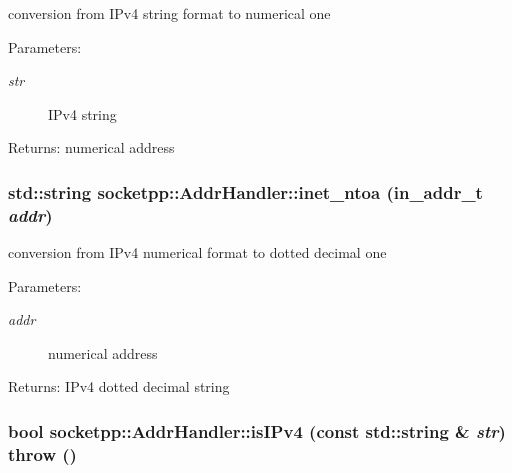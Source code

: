 conversion from IPv4 string format to numerical one 

\begin{Desc}
\item[Parameters:]
\begin{description}
\item[{\em str}]IPv4 string \end{description}
\end{Desc}
\begin{Desc}
\item[Returns:]numerical address \end{Desc}
\hypertarget{classsocketpp_1_1AddrHandler_a4377d84c8ea976aeada2b2eb0ac248d}{
\subsubsection[{inet\_\-ntoa}]{\setlength{\rightskip}{0pt plus 5cm}std::string socketpp::AddrHandler::inet\_\-ntoa (in\_\-addr\_\-t {\em addr})}}
\label{classsocketpp_1_1AddrHandler_a4377d84c8ea976aeada2b2eb0ac248d}


conversion from IPv4 numerical format to dotted decimal one 

\begin{Desc}
\item[Parameters:]
\begin{description}
\item[{\em addr}]numerical address \end{description}
\end{Desc}
\begin{Desc}
\item[Returns:]IPv4 dotted decimal string \end{Desc}
\hypertarget{classsocketpp_1_1AddrHandler_652e24c273f7905cebf8d04b3cfef74d}{
\subsubsection[{isIPv4}]{\setlength{\rightskip}{0pt plus 5cm}bool socketpp::AddrHandler::isIPv4 (const std::string \& {\em str})  throw ()}}
\label{classsocketpp_1_1AddrHandler_652e24c273f7905cebf8d04b3cfef74d}


